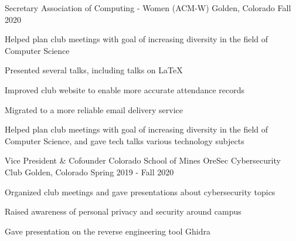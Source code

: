 \vspace{-2.0mm}

\begin{cventries}


\cventry
  {Secretary}
  {Association of Computing - Women (ACM-W)}
  {Golden, Colorado}
  {Fall 2020}
  {
    \begin{cvitems}
      \ifcv
      \item {Helped plan club meetings with goal of increasing diversity in the field of Computer Science}
      \item {Presented several talks, including talks on \LaTeX } %
      \item {Improved club website to enable more accurate attendance records}
      \item {Migrated to a more reliable email delivery service}
      \else
      \item {Helped plan club meetings with goal of increasing diversity in the field of Computer Science, and gave tech talks various technology subjects} %
      \fi
    \end{cvitems}
  }

  \cventry
    {Vice President \& Cofounder} %
    {Colorado School of Mines OreSec Cybersecurity Club} %
    {Golden, Colorado} %
    {Spring 2019 - Fall 2020} %
    {
      \begin{cvitems} %
        \item {Organized club meetings and gave presentations about
            cybersecurity topics}
          \ifcv
        \item {Raised awareness of personal privacy and security around campus}
        \item {Gave presentation on the reverse engineering tool Ghidra}
        \fi
      \end{cvitems}
    }


\end{cventries}
